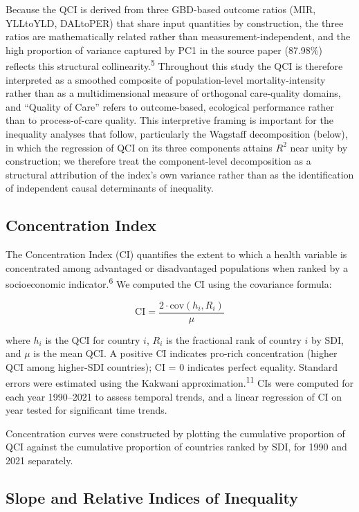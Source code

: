\documentclass[12pt]{article}
\begin{document}
Because the QCI is derived from three GBD-based outcome ratios (MIR, YLLtoYLD, DALtoPER) that share input quantities by construction, the three ratios are mathematically related rather than measurement-independent, and the high proportion of variance captured by PC1 in the source paper (87.98\%) reflects this structural collinearity.\textsuperscript{5} Throughout this study the QCI is therefore interpreted as a smoothed composite of population-level mortality-intensity rather than as a multidimensional measure of orthogonal care-quality domains, and ``Quality of Care'' refers to outcome-based, ecological performance rather than to process-of-care quality. This interpretive framing is important for the inequality analyses that follow, particularly the Wagstaff decomposition (below), in which the regression of QCI on its three components attains $R^2$ near unity by construction; we therefore treat the component-level decomposition as a structural attribution of the index's own variance rather than as the identification of independent causal determinants of inequality.

\subsection{Concentration Index}

The Concentration Index (CI) quantifies the extent to which a health variable is concentrated among advantaged or disadvantaged populations when ranked by a socioeconomic indicator.\textsuperscript{6} We computed the CI using the covariance formula:

\begin{equation}
\text{CI} = \frac{2 \cdot \text{cov}(h_i, R_i)}{\mu}
\end{equation}

where $h_i$ is the QCI for country $i$, $R_i$ is the fractional rank of country $i$ by SDI, and $\mu$ is the mean QCI. A positive CI indicates pro-rich concentration (higher QCI among higher-SDI countries); CI = 0 indicates perfect equality. Standard errors were estimated using the Kakwani approximation.\textsuperscript{11} CIs were computed for each year 1990--2021 to assess temporal trends, and a linear regression of CI on year tested for significant time trends.

Concentration curves were constructed by plotting the cumulative proportion of QCI against the cumulative proportion of countries ranked by SDI, for 1990 and 2021 separately.

\subsection{Slope and Relative Indices of Inequality}
\end{document}
